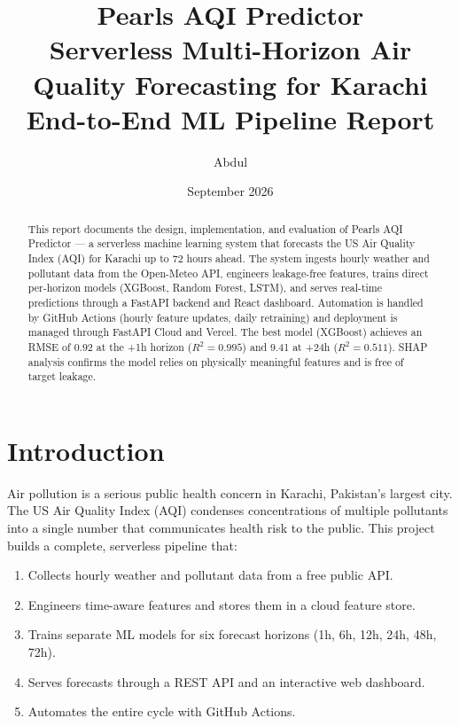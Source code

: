 \documentclass[12pt, a4paper]{article}
\title{
  \textbf{Pearls AQI Predictor} \\[0.3em]
  \large Serverless Multi-Horizon Air Quality Forecasting for Karachi \\[0.5em]
  \normalsize End-to-End ML Pipeline Report
}
\author{Abdul}
\date{September 2026}
\begin{document}
\maketitle
\thispagestyle{empty}

\begin{abstract}
This report documents the design, implementation, and evaluation of Pearls AQI Predictor --- a serverless machine learning system that forecasts the US Air Quality Index (AQI) for Karachi up to 72 hours ahead.  The system ingests hourly weather and pollutant data from the Open-Meteo API, engineers leakage-free features, trains direct per-horizon models (XGBoost, Random Forest, LSTM), and serves real-time predictions through a FastAPI backend and React dashboard.  Automation is handled by GitHub Actions (hourly feature updates, daily retraining) and deployment is managed through FastAPI Cloud and Vercel.  The best model (XGBoost) achieves an RMSE of 0.92 at the +1h horizon ($R^2 = 0.995$) and 9.41 at +24h ($R^2 = 0.511$).  SHAP analysis confirms the model relies on physically meaningful features and is free of target leakage.
\end{abstract}

\tableofcontents
\newpage

\section{Introduction}

Air pollution is a serious public health concern in Karachi, Pakistan's largest city.  The US Air Quality Index (AQI) condenses concentrations of multiple pollutants into a single number that communicates health risk to the public.  This project builds a complete, serverless pipeline that:

\begin{enumerate}
  \item Collects hourly weather and pollutant data from a free public API.
  \item Engineers time-aware features and stores them in a cloud feature store.
  \item Trains separate ML models for six forecast horizons (1h, 6h, 12h, 24h, 48h, 72h).
  \item Serves forecasts through a REST API and an interactive web dashboard.
  \item Automates the entire cycle with GitHub Actions.
\end{enumerate}
\end{document}
